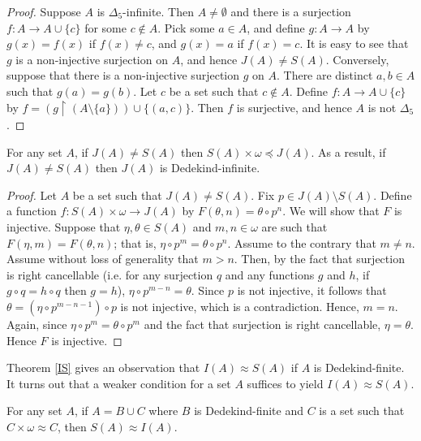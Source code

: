 \begin{proof}
Suppose $A$ is $\Delta_5$-infinite. Then $A \neq \emptyset$ and there is a surjection $f:A \rightarrow A \cup\{c\}$ for some $c\notin A$. Pick some $a\in A$, and define $g:A \rightarrow A$ by $g(x)=f(x)$ if $f(x) \neq c$, and $g(x)=a$ if $f(x) = c$. It is easy to see that $g$ is a non-injective surjection on $A$, and hence $J(A) \neq S(A)$. Conversely, suppose that there is a non-injective surjection $g$ on $A$. There are distinct $a,b \in A$ such that $g(a) = g(b)$. Let $c$ be a set such that $c\notin A$. Define $f:A \rightarrow A\cup\{c\}$ by $f = \left(g\restriction(A \setminus\{a\})\right) \cup \{(a,c)\}$. Then $f$ is surjective, and hence $A$ is not $\Delta_5$.
\end{proof}

\begin{theorem}\label{JSomega}
For any set $A$, if $J(A)\neq S(A)$ then $S(A)\times \omega \preceq J(A)$. As a result, if $J(A)\neq S(A)$ then $J(A)$ is Dedekind-infinite. 
\end{theorem}

\begin{proof}
Let $A$ be a set such that $J(A)\neq S(A)$. Fix $p \in J(A) \setminus S(A)$. Define a function $f:S(A) \times \omega \rightarrow J(A)$ by $F(\theta,n) = \theta \circ p^n$. We will show that $F$ is injective. Suppose that $\eta,\theta \in S(A)$ and $m,n\in\omega$ are such that $F(\eta,m)=F(\theta,n)$; that is, $\eta \circ p^m = \theta \circ p^n$. Assume to the contrary that $m \neq n$. Assume without loss of generality that $m>n$. Then, by the fact that surjection is right cancellable (i.e. for any surjection $q$ and any functions $g$ and $h$, if $g\circ q=h\circ q$ then $g=h$), $\eta \circ p^{m-n} = \theta$. Since $p$ is not injective, it follows that $\theta = (\eta \circ p^{m-n-1}) \circ p$ is not injective, which is a contradiction. Hence, $m=n$. Again, since $\eta\circ p^{m}=\theta\circ p^{m}$ and the fact that surjection is right cancellable, $\eta = \theta$. Hence $F$ is injective.
\end{proof}

Theorem \ref{IS} gives an observation that $I(A) \approx S(A)$ if $A$ is Dedekind-finite. It turns out that a weaker condition for a set $A$ suffices to yield $I(A) \approx S(A)$.

\begin{theorem}
     For any set $A$, if $A=B\cup C$ where $B$ is Dedekind-finite and $C$ is a set such that $C\times\omega\approx C$, then $S(A)\approx I(A)$.
\end{theorem}


